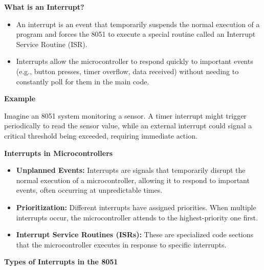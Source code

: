 \documentclass[
]{article}
\begin{document}
\textbf{What is an Interrupt?}

\begin{itemize}
\item
  An interrupt is an event that temporarily suspends the normal
  execution of a program and forces the 8051 to execute a special
  routine called an Interrupt Service Routine (ISR).
\item
  Interrupts allow the microcontroller to respond quickly to important
  events (e.g., button presses, timer overflow, data received) without
  needing to constantly poll for them in the main code.
\end{itemize}

\textbf{Example}

Imagine an 8051 system monitoring a sensor. A timer interrupt might
trigger periodically to read the sensor value, while an external
interrupt could signal a critical threshold being exceeded, requiring
immediate action.

\textbf{Interrupts in Microcontrollers}

\begin{itemize}
\item
  \textbf{Unplanned Events:} Interrupts are signals that temporarily
  disrupt the normal execution of a microcontroller, allowing it to
  respond to important events, often occurring at unpredictable times.
\item
  \textbf{Prioritization:} Different interrupts have assigned
  priorities. When multiple interrupts occur, the microcontroller
  attends to the highest-priority one first.
\item
  \textbf{Interrupt Service Routines (ISRs):} These are specialized code
  sections that the microcontroller executes in response to specific
  interrupts.
\end{itemize}

\textbf{Types of Interrupts in the 8051}
\end{document}

